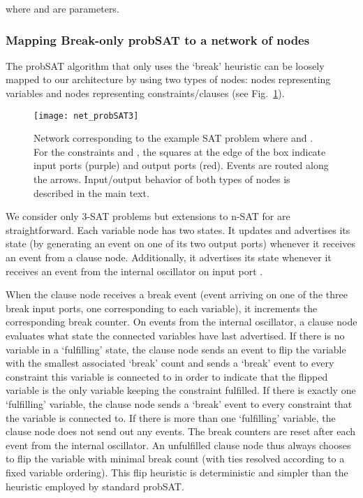 \documentclass[10pt]{article}
\begin{document}
where  and  are parameters. 


\subsubsection*{Mapping Break-only probSAT to a network of nodes}
The probSAT algorithm that only uses the `break' heuristic can be loosely mapped to our architecture by using two types of nodes: nodes representing variables and nodes representing constraints/clauses (see Fig.~\ref{fig:net_spa}).
\begin{figure}
  \centering
     \texttt{[image: net\_probSAT3]} 
     \caption{Network corresponding to the example SAT problem  where  and . For the constraints  and , the squares at the edge of the box indicate input ports (purple) and output ports (red). Events are routed along the arrows. Input/output behavior of both types of nodes is described in the main text.}
\label{fig:net_spa}
\end{figure}	
We consider only 3-SAT problems but extensions to n-SAT for  are straightforward. Each variable node has two states. It updates and advertises its state (by generating an event on one of its two output ports) whenever it receives an event from a clause node. Additionally, it advertises its state whenever it receives an event from the internal oscillator on input port . 

When the clause node receives a break event (event arriving on one of the three break input ports, one corresponding to each variable), it increments the corresponding break counter. On events from the internal oscillator, a clause node evaluates what state the connected variables have last advertised. If there is no variable in a `fulfilling' state, the clause node sends an  event to flip the variable with the smallest associated `break' count  and sends a `break' event to every constraint this variable is connected to in order to indicate that the flipped variable is the only variable keeping the constraint fulfilled. If there is exactly one `fulfilling' variable, the clause node sends a `break' event to every constraint that the variable is connected to. If there is more than one `fulfilling' variable, the clause node does not send out any events. The break counters are reset after each event from the internal oscillator.  
An unfulfilled clause node thus always chooses to flip the variable with minimal break count (with ties resolved according to a fixed variable ordering). This flip heuristic is deterministic and simpler than the heuristic employed by standard probSAT.
\end{document}
